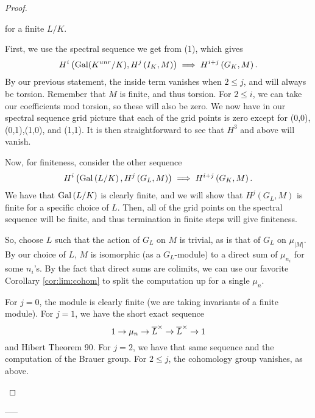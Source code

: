 \begin{proof}
\begin{enumerate}[(1)]
\begin{enumerate}[(1)]
					for a finite \(L / K\).
			\end{enumerate}
					
			First, we use the spectral sequence we get from (1), which
			gives 
			\[
				H^{i}\left( \operatorname{Gal}(K^{unr} / K), 
				H^{j}\left( I_{K}, M \right)\right) 
				\implies H^{i + j}\left( G_{K},M \right)
			.\] 
			By our previous statement, the inside term vanishes when
			\(2 \leq j\), and will always be torsion.
			Remember that \(M\) is finite, and thus torsion.
			For \(2 \leq i\), we can take our coefficients mod torsion,
			so these will also be zero. %
			We now have in our spectral sequence grid picture that 
			each of the grid points is zero except for 
			(0,0),(0,1),(1,0), and (1,1).
			It is then straightforward to see that \(H^{3}\) and above
			will vanish.

			Now, for finiteness, consider the other sequence
			\[
				H^{i}\left( \operatorname{Gal}\left( L / K \right),
				H^{j}\left( G_{L},M \right)\right)
				\implies H^{i+j}\left( G_{K},M \right)
			.\] 
			We have that \(\operatorname{Gal}\left( L / K \right)\) is clearly finite,
			and we will show that \(H^{j}\left( G_{L},M \right)\) is
			finite for a specific choice of \(L\).
			Then, all of the grid points on the spectral sequence will
			be finite, and thus termination in finite steps will give 
			finiteness.

			So, choose \(L\) such that the action of \(G_{L}\) on \(M\) 
			is trivial, as is that of \(G_{L}\) on \(\mu_{\left| M \right|}\).
			By our choice of \(L\), \(M\) is isomorphic (as a
			\(G_{L}\)-module) to a direct sum of \(\mu_{n_{i}}\) for 
			some \(n_{i}\)'s.
			By the fact that direct sums are colimits, we can use
			our favorite Corollary \ref{cor:lim:cohom} to split
			the computation up for a single \(\mu_{n}\).

			For \(j=0\), the module is clearly finite (we are taking
			invariants of a finite module).
			For \(j=1\), we have the short exact sequence
			\[
			1 \to \mu_{n} \to \overline{L}^{\times} \to 
			\overline{L}^{\times} \to 1
			\] 
			and Hibert Theorem 90.
			For \(j = 2\), we have that same sequence and the 
			computation of the Brauer group.
			For \(2 \leq j\), the cohomology group vanishes, 
			as above.

	\end{enumerate}
\end{proof}

-----






